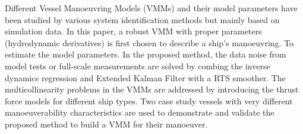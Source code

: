 Different Vessel Manoeuvring Models (VMMs) and their model parameters have been studied by various system identification methods but mainly based on simulation data. In this paper, a robust VMM with proper parameters (hydrodynamic derivatives) is first chosen to describe a ship’s manoeuvring. To estimate the model parameters. In the proposed method, the data noise from model tests or full-scale measurements are solved by combing the inverse dynamics regression and Extended Kalman Filter with a RTS smoother. The multicollinearity problems in the VMMs are addressed by introducing the thrust force models for different ship types. Two case study vessels with very different manoeuverability characteristics are used to demonstrate and validate the proposed method to build a VMM for their manoeuver.